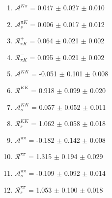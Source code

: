 \begin{enumerate}
\item $\mathcal{A}^{K\pi}$ = 0.047 $\pm$ 0.027 $\pm$ 0.010
\item $\mathcal{A}_s^{\pi K}$ = 0.006 $\pm$ 0.017 $\pm$ 0.012
\item $\mathcal{R}_{\pi K}^+$ = 0.064 $\pm$ 0.021 $\pm$ 0.002
\item $\mathcal{R}_{\pi K}^-$ = 0.095 $\pm$ 0.021 $\pm$ 0.002
\item $\mathcal{A}^{KK}$ = -0.051 $\pm$ 0.101 $\pm$ 0.008
\item $\mathcal{R}^{KK}$ = 0.918 $\pm$ 0.099 $\pm$ 0.020
\item $\mathcal{A}_s^{KK}$ = 0.057 $\pm$ 0.052 $\pm$ 0.011
\item $\mathcal{R}_{s}^{KK}$ = 1.062 $\pm$ 0.058 $\pm$ 0.018
\item $\mathcal{A}^{\pi\pi}$ = -0.182 $\pm$ 0.142 $\pm$ 0.008
\item $\mathcal{R}^{\pi\pi}$ = 1.315 $\pm$ 0.194 $\pm$ 0.029
\item $\mathcal{A}_s^{\pi\pi}$ = -0.109 $\pm$ 0.092 $\pm$ 0.014
\item $\mathcal{R}_{s}^{\pi\pi}$ = 1.053 $\pm$ 0.100 $\pm$ 0.018
\end{enumerate}
